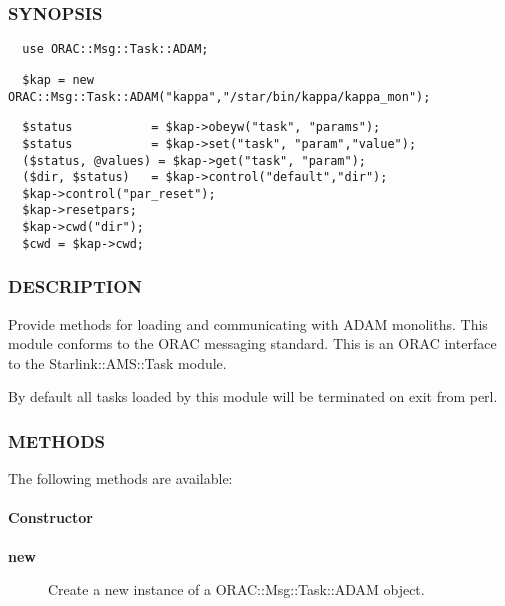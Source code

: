 \begin{description}
\subsubsection*{SYNOPSIS\label{ORAC::Msg::Task::ADAM_SYNOPSIS}}
\begin{verbatim}
  use ORAC::Msg::Task::ADAM;
\end{verbatim}
\begin{verbatim}
  $kap = new ORAC::Msg::Task::ADAM("kappa","/star/bin/kappa/kappa_mon");
\end{verbatim}
\begin{verbatim}
  $status           = $kap->obeyw("task", "params");
  $status           = $kap->set("task", "param","value");
  ($status, @values) = $kap->get("task", "param");
  ($dir, $status)   = $kap->control("default","dir");
  $kap->control("par_reset");
  $kap->resetpars;
  $kap->cwd("dir");
  $cwd = $kap->cwd;
\end{verbatim}
\subsubsection*{DESCRIPTION\label{ORAC::Msg::Task::ADAM_DESCRIPTION}}


Provide methods for loading and communicating with ADAM monoliths.
This module conforms to the ORAC messaging standard. This is an
ORAC interface to the Starlink::AMS::Task module.



By default all tasks loaded by this module will be terminated
on exit from perl.

\subsubsection*{METHODS\label{ORAC::Msg::Task::ADAM_METHODS}}


The following methods are available:

\paragraph*{Constructor\label{ORAC::Msg::Task::ADAM_Constructor}}
\begin{description}

\item[{\textbf{new}}] \mbox{}

Create a new instance of a ORAC::Msg::Task::ADAM object.


\end{description}
\end{description}
